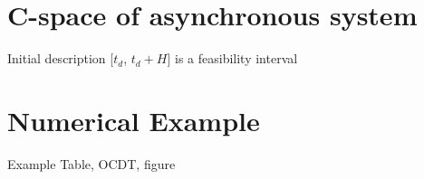 \documentclass{beamer}
\begin{document}
\section{C-space of asynchronous system}


    \begin{frame}
    \end{frame}

	\begin{frame}{Initial description}
		[$t_d$, $t_d + H$] is a feasibility interval
	\end{frame}

\section{Numerical Example}
	\begin{frame}{Example}
		Table, OCDT, figure
	\end{frame}




\end{document}
